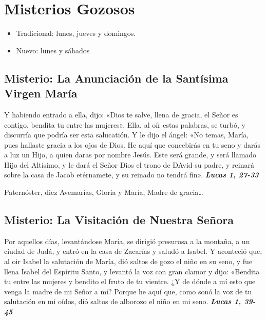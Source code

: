 \documentclass[./rosary.tex]{subfiles}
\newcounter{joyful-counter}
\begin{document}
\section*{Misterios Gozosos}

\begin{itemize}
      \item Tradicional: lunes, jueves y domingos.
      \item Nuevo: lunes y sábados
\end{itemize}

\subsection*{ Misterio: La Anunciación de la Santísima Virgen María}
Y habiendo entrado a ella, dijo: «Dios te salve, llena de gracia, el Señor es contigo, bendita tu entre las mujeres».
Ella, al oír estas palabras, se turbó, y discurría que podría ser esta salucatión. Y le dijo el ángel: «No temas, María,
pues hallaste gracia a los ojos de Dios. He aquí que concebirás en tu seno y darás a luz un Hijo, a quien daras por
nombre Jesús. Este será grande, y será llamado Hijo del Altísimo, y le dará el Señor Dios el trono de DAvid su padre,
y reinará sobre la casa de Jacob etérnamete, y su reinado no tendrá fin». \textbf{\emph{Lucas 1, 27-33}}

\begin{center}
      Paternóster, diez Avemarías, Gloria y María, Madre de gracia{\ldots}
\end{center}
\bigskip

\subsection*{ Misterio: La Visitación de Nuestra Señora}

Por aquellos días, levantándose María, se dirigió presurosa a la montaña, a un ciudad de Judá, y entró en la casa de Zacarías y saludó a Isabel.
Y aconteció que, al oir Isabel la salutación de María, dió saltos de gozo el niño en su seno, y fue llena Isabel del Espíritu Santo,
y levantó la voz con gran clamor y dijo: «Bendita tu entre las mujeres y bendito el fruto de tu vientre. ¿Y de dónde a mí esto que venga la madre de mi Señor a mí?
Porque he aquí que, como sonó la voz de tu salutación en mi oídos, dió saltos de alborozo el niño en mi seno. 
\textbf{\emph{Lucas 1, 39-45}}
\end{document}
